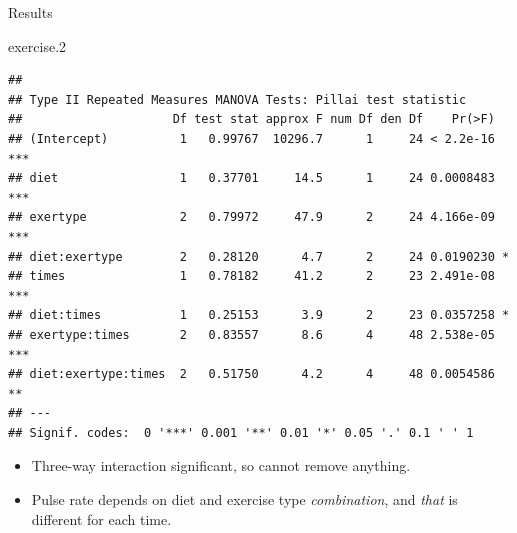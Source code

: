 \documentclass[ignorenonframetext,]{beamer}
\newenvironment{Shaded}{\begin{snugshade}}{\end{snugshade}}
\newcommand{\FloatTok}[1]{\textcolor[rgb]{0.00,0.00,0.81}{#1}}
\newcommand{\NormalTok}[1]{#1}
\begin{document}
\begin{frame}[fragile]{Results}
\protect\hypertarget{results-1}{}

\scriptsize

\begin{Shaded}
\begin{Highlighting}[]
\NormalTok{exercise}\FloatTok{.2}
\end{Highlighting}
\end{Shaded}

\begin{verbatim}
## 
## Type II Repeated Measures MANOVA Tests: Pillai test statistic
##                     Df test stat approx F num Df den Df    Pr(>F)    
## (Intercept)          1   0.99767  10296.7      1     24 < 2.2e-16 ***
## diet                 1   0.37701     14.5      1     24 0.0008483 ***
## exertype             2   0.79972     47.9      2     24 4.166e-09 ***
## diet:exertype        2   0.28120      4.7      2     24 0.0190230 *  
## times                1   0.78182     41.2      2     23 2.491e-08 ***
## diet:times           1   0.25153      3.9      2     23 0.0357258 *  
## exertype:times       2   0.83557      8.6      4     48 2.538e-05 ***
## diet:exertype:times  2   0.51750      4.2      4     48 0.0054586 ** 
## ---
## Signif. codes:  0 '***' 0.001 '**' 0.01 '*' 0.05 '.' 0.1 ' ' 1
\end{verbatim}

\normalsize

\begin{itemize}
\item
  Three-way interaction significant, so cannot remove anything.
\item
  Pulse rate depends on diet and exercise type \emph{combination}, and
  \emph{that} is different for each time.
\end{itemize}

\end{frame}
\end{document}

